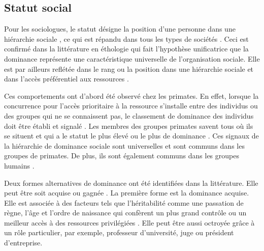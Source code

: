 \subsection{Statut social}

	 Pour les sociologues, le statut désigne la position d'une personne dans une hiérarchie sociale \cite{ellyson1985power}, ce qui est répandu dans tous les types de sociétés \cite{lips1991women}.
	Ceci est confirmé  dans la littérature en éthologie qui fait l'hypothèse unificatrice que la dominance représente une caractéristique universelle de l'organisation sociale. Elle est par ailleurs reflétée dans le rang ou la position dans une hiérarchie sociale \cite{burgoon1998nature} et dans l'accès préférentiel aux ressources \cite{liska1990dominance}.
	
	Ces comportements ont d'abord été observé chez les primates. En effet, lorsque la concurrence pour l'accès prioritaire à la ressource s'installe entre des individus ou des groupes qui ne se connaissent pas, le classement de dominance des individus doit être établi et signalé \cite{burgoon1998nature}. Les membres des groupes primates savent tous où ils se situent et qui a le statut le plus élevé ou le plus de dominance \cite{smither1993authoritarianism}.
	Ces signaux de la hiérarchie de dominance sociale sont universelles et sont communs dans les groupes de primates. De plus, ils sont également communs dans les groupes humains \cite{burgoon1998nature}.
	
	Deux formes alternatives de dominance ont été identifiées dans la littérature. Elle peut être soit acquise ou gagnée \cite{liska1990dominance}.
	La première forme est la dominance acquise. Elle est associée à des facteurs tels que l'héritabilité comme une passation de règne, l'âge et l'ordre de naissance qui confèrent un plus grand contrôle ou un meilleur accès à des ressources privilégiées \cite{cattell1970handbook}. Elle peut être aussi octroyée grâce à un rôle particulier, par exemple, professeur d'université, juge ou président d'entreprise.
	

